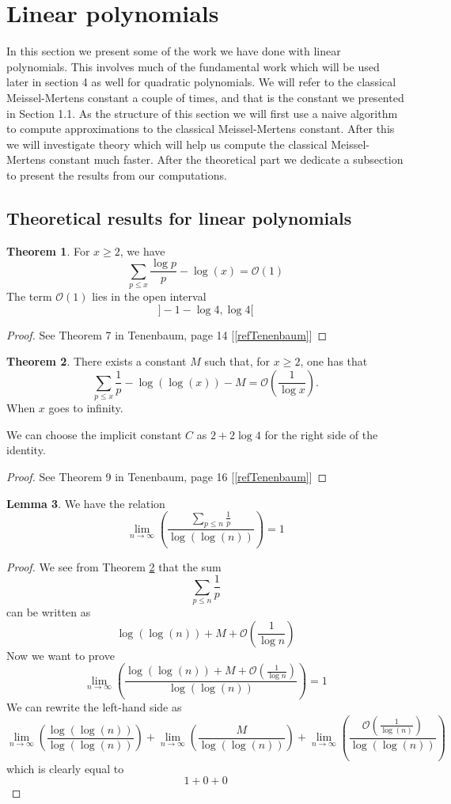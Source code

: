 \documentclass{article}
\theoremstyle{definition}
\newtheorem{theorem}{Theorem}[section]
\newtheorem{lemma}[theorem]{Lemma}
\theoremstyle{remark}
\begin{document}
\section{Linear polynomials}

In this section we present some of the work we have done with linear polynomials. This involves much of the fundamental work which will be used later in section 4 as well for quadratic polynomials. We will refer to the classical Meissel-Mertens constant a couple of times, and that is the constant we presented in Section 1.1.
\newline
As the structure of this section we will first use a naive algorithm to compute approximations to the classical Meissel-Mertens constant. After this we will investigate theory which will help us compute the classical Meissel-Mertens constant much faster. After the theoretical part we dedicate a subsection to present the results from our computations.
\subsection{Theoretical results for linear polynomials}
\begin{theorem}
For $x\geq 2$, we have
$$\sum_{p\leq x }\frac{\log p}{p}-\log (x)= \mathcal{O}(1)$$
The term $\mathcal{O}(1)$ lies in the open interval
$$]-1-\log 4, \log 4 [ $$
\end{theorem}
\begin{proof}
See Theorem 7 in Tenenbaum, page 14 [\ref{refTenenbaum}]
\end{proof}

\begin{theorem} \label{Thm9Tenenbaum}
There exists a constant $M$ such that, for $x\geq 2$, one has that
$$\sum_{p\leq x}\frac{1}{p}-\log(\log(x))-M=\mathcal{O}\left(\frac{1}{\log x}\right).$$
When $x$ goes to infinity.

We can choose the implicit constant $C$ as $2+2\log 4$ for  the right side of the identity.
\end{theorem}
\begin{proof}
See Theorem 9 in Tenenbaum, page 16 [\ref{refTenenbaum}]
\end{proof}

\begin{lemma}\label{S is 1}
We have the relation
$$\lim_{n \rightarrow \infty }\left(\frac{\sum_{p \leq n}\frac{1}{p}}{\log(\log(n))}\right)=1$$
\end{lemma}
\begin{proof}
We see from Theorem \ref{Thm9Tenenbaum} that the sum
$$\sum_{p \leq n}\frac{1}{p}$$
can be written as
$$\log(\log(n))+M+\mathcal{O}\left(\frac{1}{\log n}\right)$$
Now we want to prove
$$\lim_{n \rightarrow \infty }\left(\frac{\log(\log(n))+M+\mathcal{O}\left(\frac{1}{\log n}\right)}{\log(\log(n))}\right)=1$$
We can rewrite the left-hand side as
$$\lim_{n \rightarrow \infty}\left(\frac{\log(\log(n))}{\log(\log(n))}\right)+\lim_{n \rightarrow \infty}\left(\frac{M}{\log(\log(n))}\right)+\lim_{n \rightarrow \infty}\left(\frac{\mathcal{O}(\frac{1}{\log(n)})}{\log(\log(n))}\right)$$
which is clearly equal to
$$1+0+0$$
\end{proof}
\end{document}
